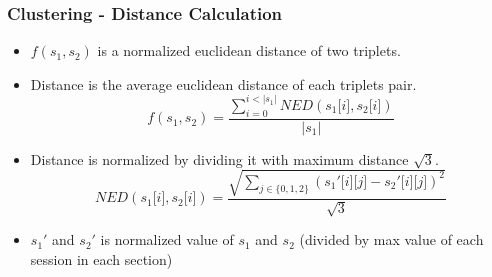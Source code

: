 \documentclass[xcolor=table]{beamer}
\begin{document}
\begin{frame}
\frametitle{Clustering - Distance Calculation}
\begin{itemize}


\item $f(\textit{s}_1,\textit{s}_2)$ is a normalized euclidean distance of two triplets.
\item Distance is the average euclidean distance of each triplets pair. 
$$f(\textit{s}_1,\textit{s}_2) = \frac{\displaystyle\sum_{i=0}^{i < \lvert\textit{s}_1\lvert} \textit{N}ED(\textit{s}_1\lbrack i \rbrack,\textit{s}_2\lbrack i \rbrack)}{ \lvert\textit{s}_1\lvert}$$
\item Distance is normalized by dividing it with maximum distance $\sqrt{3}$.
$$ \textit{N}ED(\textit{s}_1\lbrack i \rbrack,\textit{s}_2\lbrack i \rbrack) = \frac{\sqrt{\displaystyle\sum_{j \in \{0,1,2\}}(\textit{s}_1'\lbrack i \rbrack\lbrack j \rbrack - \textit{s}_2'\lbrack i \rbrack\lbrack j \rbrack)^2}}{\sqrt{3}}$$
\item $\textit{s}_1'$ and $\textit{s}_2'$ is normalized value of $\textit{s}_1$ and $\textit{s}_2$ (divided by max value of each session in each section)

\end{itemize}
\end{frame}
\end{document}
